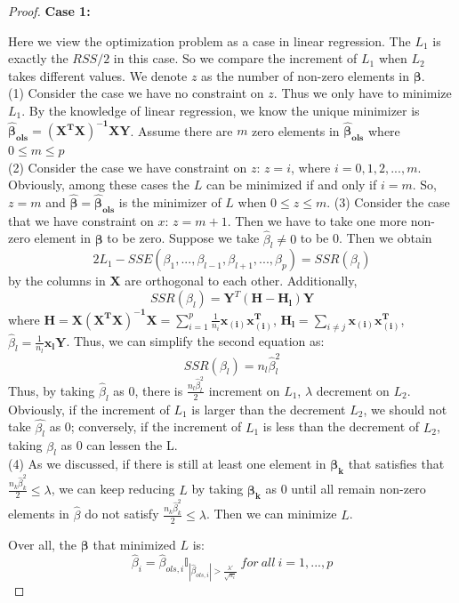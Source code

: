 \documentclass{article}
\newtheorem{proof}{Proof}
\begin{document}
\begin{appendices}
\begin{proof}
	\textbf{Case 1:}\par 
	 Here we view the optimization problem as a case in linear regression. 
	The $L_1$ is exactly the $RSS/2$ in this case. So we compare the increment of $L_1$  when $L_2$ takes different values. We denote $z$ as the number of  non-zero elements in $\bm{\beta}$.\\
	(1) Consider the case we have no constraint on $z$. Thus we only have to minimize $L_1$. By the knowledge of linear regression, we know the unique minimizer is $\bm{\hat{\beta}_{ols}}=\mathbf{(X^TX)^{-1}XY}$. Assume there are $m$ zero elements in $\bm{\hat{\beta}_{ols}}$ where $0\leq m \leq p$ \\
	(2) Consider the case we have constraint on $z$: $z = i$, where $i=0,1,2,...,m$. Obviously, among these cases the $L$ can be minimized if and only if $i=m$. So, $z=m$ and $\bm{\hat{\beta}}=\bm{\hat{\beta}_{ols}}$ is the minimizer of $L$ when $0\leq z\leq m$.
	(3) Consider the case that we have constraint on $x$: $z=m+1$. Then we have to take one more non-zero element in $\bm{\beta}$ to be zero. Suppose we take $\hat{\beta}_l \neq 0$ to be 0. Then we obtain 
	\begin{equation*}
		2L_1 -SSE(\beta_1,...,\beta_{l-1},\beta_{l+1},...,\beta_p)=SSR(\beta_l)
	\end{equation*}
	by the columns in $\mathbf{X}$ are orthogonal to each other. Additionally,
	\begin{equation*}
		SSR(\beta_l) = \mathbf{Y}^T(\mathbf{H-H_l})\mathbf{Y} 
	\end{equation*}
	where $\mathbf{H=X(X^TX)^{-1}X}=\sum_{i=1}^p\frac{1}{n_i}\mathbf{x_{(i)}x_{(i)}^T}$, $\mathbf{H_l} = \sum_{i\neq j}\mathbf{x_{(i)}x_{(i)}^T}$, $\hat{\beta}_l = \frac{1}{n_l}\mathbf{x_{l}Y}$. Thus, we can simplify the second equation as:
	\begin{equation*}
		SSR(\beta_l) = n_l\hat{\beta}_l^2
	\end{equation*}
	Thus, by taking $\hat{\beta}_l$ as 0, there is $\frac{n_l\hat{\beta}_l^2}{2}$ increment on $L_1$, $\lambda$ decrement on $L_2$. Obviously, if the increment of $L_1$ is larger than the decrement $L_2$, we should not take $\hat{\beta_l}$ as 0; conversely, if the increment of $L_1$ is less than the decrement of $L_2$, taking $\hat{\beta_l}$ as 0 can lessen the L.\\
	(4) As we discussed, if there is still at least one element in $\bm{\beta_k}$ that satisfies that $\frac{n_k\hat{\beta}_k^2}{2}\leq\lambda$, we can keep reducing $L$ by taking $\bm{\beta_k}$ as 0 until all remain non-zero elements in $\hat{\beta}$ do not satisfy $\frac{n_k\hat{\beta}_k^2}{2}\leq\lambda$. Then we can minimize $L$.\par 
	Over all, the $\bm{\beta}$ that minimized $L$ is:
	\begin{equation*}
			\hat{\beta}_i = \hat{\beta}_{ols,i}\mathbb{I}_{|\hat{\beta}_{ols,i}|>\frac{\lambda'}{\sqrt{n_i}}}\ for\ all\ i=1,...,p
	\end{equation*}
	

\end{proof}
\end{appendices}
\end{document}
